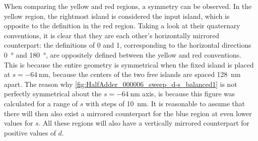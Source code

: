 \documentclass[11pt,a4paper,english,twoside]{article}
\begin{document}
When comparing the yellow and red regions, a symmetry can be observed. In the yellow region, the rightmost island is considered the input island, which is opposite to the definition in the red region. Taking a look at their quaternary conventions, it is clear that they are each other's horizontally mirrored counterpart: the definitions of 0 and 1, corresponding to the horizontal directions \SI{0}{\degree} and \SI{180}{\degree}, are oppositely defined between the yellow and red conventions. This is because the entire geometry is symmetrical when the fixed island is placed at $s=\SI{-64}{\nano\metre}$, because the centers of the two free islands are spaced \SI{128}{\nano\metre} apart. The reason why \cref{fig:HalfAdder_000006_sweep_d-s_balanced1} is not perfectly symmetrical about the $s=\SI{-64}{\nano\metre}$ axis, is because this figure was calculated for a range of $s$ with steps of \SI{10}{\nano\metre}. It is reasonable to assume that there will then also exist a mirrored counterpart for the blue region at even lower values for $s$. All these regions will also have a vertically mirrored counterpart for positive values of $d$.
\end{document}
